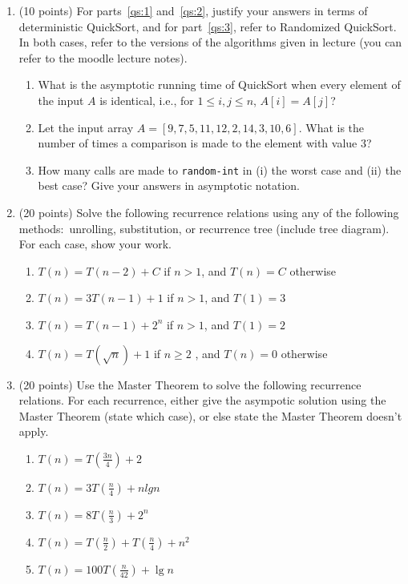 \documentclass[12pt]{article}
\begin{document}
\renewcommand{\headrulewidth}{0.4pt}


\begin{enumerate}

	\item (10 points) For parts~\eqref{qs:1} and~\eqref{qs:2}, justify your answers in terms of deterministic QuickSort, and for part~\eqref{qs:3}, refer to Randomized QuickSort. In both cases, refer to the versions of the algorithms given in lecture (you can refer to the moodle lecture notes).
	\begin{enumerate}
	\item \label{qs:1} What is the asymptotic running time of QuickSort when every element of the input $A$ is identical, i.e., for $1\leq i,j \leq n$, $A[i] = A[j]$?
	\item \label{qs:2} Let the input array $A = [9, 7, 5, 11, 12, 2, 14, 3, 10, 6]$. What is the number of times a comparison is made to the element with value 3?
	\item \label{qs:3} How many calls are made to {\tt random-int} in (i) the worst case and (ii) the best case? Give your answers in asymptotic notation.
	\end{enumerate}

	\newpage

    \item (20 points) Solve the following recurrence relations using any of the following methods:\ unrolling, substitution, or recurrence tree (include tree diagram). For each case, show your work.
    \begin{enumerate}
    	\item $T(n) = T(n-2) + C$ if $n>1$, and $T(n) = C$ otherwise
    	\item $T(n) = 3T(n-1) + 1$ if $n>1$, and $T(1) = 3$
    	\item $T(n) = T(n-1)+2^{n}$ if $n>1$, and $T(1) = 2$
    	\item $T(n) = T(\sqrt{n}) + 1$ if $n\geq2$ , and $T(n) = 0$ otherwise
    \end{enumerate}

    \newpage

    \item
    (20 points) Use the Master Theorem to solve the following recurrence relations. For each recurrence, either give the asympotic solution using the Master Theorem (state which case), or else state the Master Theorem doesn't apply.
    \begin{enumerate}
    	\item $T(n) = T(\frac{3n}{4}) + 2$
    	\item $T(n) = 3T(\frac{n}{4}) + nlgn$
    	\item $T(n) = 8T(\frac{n}{3}) + 2^n$
    	\item $T(n) = T(\frac{n}{2}) + T(\frac{n}{4}) + n^2$
    	\item $T(n) = 100T(\frac{n}{42}) + \lg n$
	\end{enumerate}


\end{enumerate}
\end{document}
